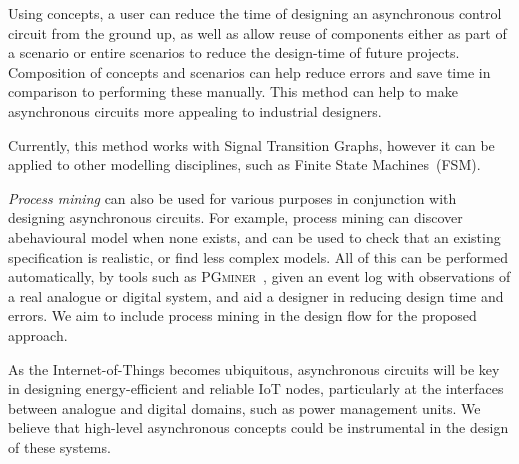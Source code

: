 \documentclass[british, journal]{IEEEtran}
\newcommand{\noun}[1]{\textsc{#1}}
\begin{document}
Using concepts, a user can reduce the time of designing an asynchronous
control circuit from the ground up, as well as allow reuse of components
either as part of a scenario or entire scenarios to reduce the design-time
of future projects. Composition of concepts and scenarios can help
reduce errors and save time in comparison to performing these manually.
This method can help to make asynchronous circuits more appealing
to industrial designers.

Currently, this method works with Signal Transition Graphs, however
it can be applied to other modelling disciplines, such as Finite State
Machines~(FSM).

\emph{Process mining} can also be used for various purposes in conjunction
with designing asynchronous circuits. For example, process mining can discover abehavioural model when none exists, and can be used to check that an existing
specification is realistic, or find less complex models. All of this can be
performed automatically, by tools such as
\noun{PGminer}~\cite{mokhov2016mining}, given
an event log with observations of a real analogue or digital system, and aid a
designer in reducing design time and errors. We aim to include process mining
in the design flow for the proposed approach.


As the Internet-of-Things becomes ubiquitous, asynchronous circuits
will be key in designing energy-efficient and reliable IoT nodes,
particularly at the interfaces between analogue and digital domains,
such as power management units. We believe that high-level asynchronous
concepts could be instrumental in the design of these systems.


\end{document}
